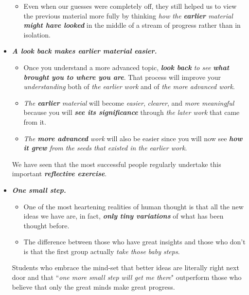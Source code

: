 \documentclass[11pt]{article}
\begin{document}
\begin{itemize}
\begin{itemize}
\item Even when our guesses were completely off, they still helped us to view the previous material more fully by thinking \emph{how the \textbf{earlier} material \textbf{might have looked}} in the middle of a stream of progress rather than in isolation. 
\end{itemize}

\item \emph{\textbf{A look back makes earlier material easier.}}
\begin{itemize}
\item Once you understand a more advanced topic, \emph{\textbf{look back} to see \textbf{what brought you to where you are}}. That process will improve your \emph{understanding} both of \emph{the earlier work} and of \emph{the more advanced work}. 

\item \emph{The \textbf{earlier} material} will become \emph{easier}, \emph{clearer}, and \emph{more meaningful} because you will \emph{\textbf{see its significance}} through \emph{the later work} that came from it. 

\item \emph{The \textbf{more advanced} work} will also be easier since you will now see \emph{\textbf{how it grew} from the seeds that existed in the earlier work}. 
\end{itemize}
We have seen that the most successful people regularly undertake this important \emph{\textbf{reflective exercise}}. 


\item \emph{\textbf{One small step.}} 
\begin{itemize}
\item One of the most heartening realities of human thought is that all the new ideas we have are, in fact, \emph{\textbf{only tiny variations}} of what has been thought before. 

\item The difference between those who have great insights and those who don’t is that the first group actually \emph{take those baby steps}.
\end{itemize}
Students who embrace the mind-set that better ideas are literally right next door and that ``\emph{one more small step will get me there}" outperform those who believe that only the great minds make great progress.
\end{itemize}
\end{document}
